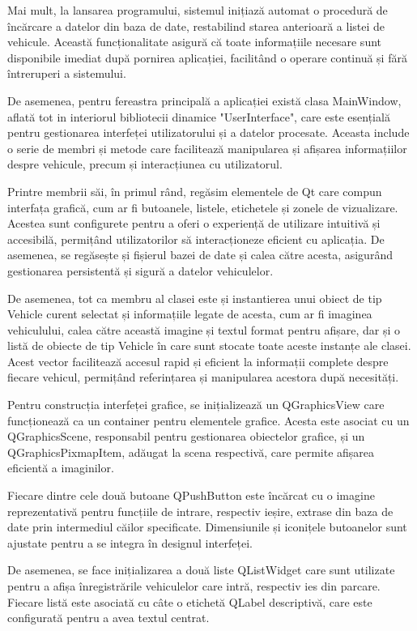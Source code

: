 \documentclass[a4paper,12pt]{report}
\begin{document}
Mai mult, la lansarea programului, sistemul inițiază automat o procedură de încărcare a datelor din baza de date, restabilind starea anterioară a listei de vehicule. Această funcționalitate asigură că toate informațiile necesare sunt disponibile imediat după pornirea aplicației, facilitând o operare continuă și fără întreruperi a sistemului.

De asemenea, pentru fereastra principală a aplicației există clasa MainWindow, aflată tot in interiorul bibliotecii dinamice "UserInterface", care este esențială pentru gestionarea interfeței utilizatorului și a datelor procesate. Aceasta include o serie de membri și metode care facilitează manipularea și afișarea informațiilor despre vehicule, precum și interacțiunea cu utilizatorul.

Printre membrii săi, în primul rând, regăsim elementele de Qt care compun interfața grafică, cum ar fi butoanele, listele, etichetele și zonele de vizualizare. Acestea sunt configurete pentru a oferi o experiență de utilizare intuitivă și accesibilă, permițând utilizatorilor să interacționeze eficient cu aplicația. De asemenea, se regăsește și fișierul bazei de date și calea către acesta, asigurând gestionarea persistentă și sigură a datelor vehiculelor.

De asemenea, tot ca membru al clasei este și instantierea unui obiect de tip Vehicle curent selectat și informațiile legate de acesta, cum ar fi imaginea vehiculului, calea către această imagine și textul format pentru afișare, dar și o listă de obiecte de tip Vehicle în care sunt stocate toate aceste instanțe ale clasei. Acest vector facilitează accesul rapid și eficient la informații complete despre fiecare vehicul, permițând referințarea și manipularea acestora după necesități.

Pentru construcția interfeței grafice, se inițializează un QGraphicsView care funcționează ca un container pentru elementele grafice. Acesta este asociat cu un QGraphicsScene, responsabil pentru gestionarea obiectelor grafice, și un QGraphicsPixmapItem, adăugat la scena respectivă, care permite afișarea eficientă a imaginilor.

Fiecare dintre cele două butoane QPushButton este încărcat cu o imagine reprezentativă pentru funcțiile de intrare, respectiv ieșire, extrase din baza de date prin intermediul căilor specificate. Dimensiunile și iconițele butoanelor sunt ajustate pentru a se integra în designul interfeței.

De asemenea, se face inițializarea a două liste QListWidget care sunt utilizate pentru a afișa înregistrările vehiculelor care intră, respectiv ies din parcare. Fiecare listă este asociată cu câte o etichetă QLabel descriptivă, care este configurată pentru a avea textul centrat.
\end{document}
